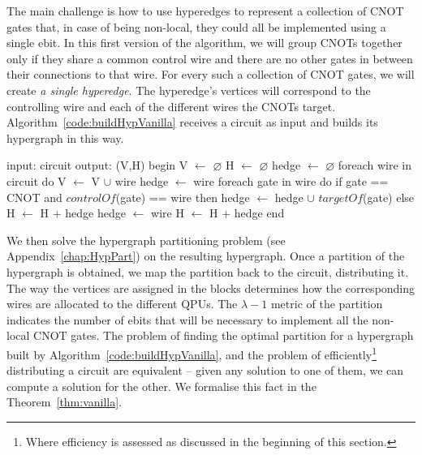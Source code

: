 The main challenge is how to use hyperedges to represent a collection of CNOT gates that, in case of being non-local, they could all be implemented using a single ebit. In this first version of the algorithm, we will group CNOTs together only if they share a common control wire and there are no other gates in between their connections to that wire. For every such a collection of CNOT gates, we will create \textit{a single hyperedge}. The hyperedge's vertices will correspond to the controlling wire and each of the different wires the CNOTs target. Algorithm~\ref{code:buildHypVanilla} receives a circuit as input and builds its hypergraph in this way. 

\begin{algorithm}[caption={Builds the hypergraph of a given circuit. \(H\) may contain multiple hyperedges connecting the same vertices. This algorithm runs in time \(O(g)\), where \(g\) is the number of gates in the input circuit.}, label={code:buildHypVanilla}]
input: circuit
output: (V,H)
begin
  V $\gets$ $\varnothing$
  H $\gets$ $\varnothing$
  hedge $\gets$ $\varnothing$
  foreach wire in circuit do
    V $\gets$ V $\cup$ {wire}
    hedge $\gets$ {wire}
    foreach gate in wire do
      if gate == CNOT and $controlOf$(gate) == wire then
        hedge $\gets$ hedge $\cup$ {$targetOf$(gate)}
      else
        H $\gets$ H $+$ {hedge}
        hedge $\gets$ {wire}
    H $\gets$ H $+$ {hedge}
end
\end{algorithm}


We then solve the hypergraph partitioning problem (see Appendix~\ref{chap:HypPart}) on the resulting hypergraph. Once a partition of the hypergraph is obtained, we map the partition back to the circuit, distributing it. The way the vertices are assigned in the blocks determines how the corresponding wires are allocated to the different QPUs. The \(\lambda-1\) metric of the partition indicates the number of ebits that will be necessary to implement all the non-local CNOT gates. The problem of finding the optimal partition for a hypergraph built by Algorithm~\ref{code:buildHypVanilla}, and the problem of efficiently\footnote{Where efficiency is assessed as discussed in the beginning of this section.} distributing a circuit are equivalent -- given any solution to one of them, we can compute a solution for the other. We formalise this fact in the Theorem~\ref{thm:vanilla}. 

